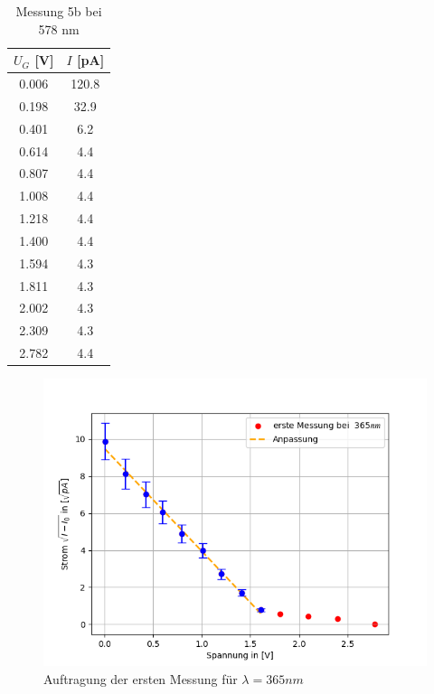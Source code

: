 \documentclass{article}
\begin{document}
\begin{table}[h!]
  \centering
  \begin{tabular}{|c|c|}
      \hline
      $U_G$ [V] & $I$ [pA] \\
      \hline
      0.006 & 120.8 \\
      0.198 & 32.9  \\
      0.401 & 6.2   \\
      0.614 & 4.4   \\
      0.807 & 4.4   \\
      1.008 & 4.4   \\
      1.218 & 4.4   \\
      1.400 & 4.4   \\
      1.594 & 4.3   \\
      1.811 & 4.3   \\
      2.002 & 4.3   \\
      2.309 & 4.3   \\
      2.782 & 4.4   \\
      \hline
  \end{tabular}
  \caption{Messung 5b bei 578 nm}
  \label{tab:messung5b}
\end{table}

\begin{figure}[h!]
  \centering
  \includegraphics[width=.8\linewidth]{402_365nm_a.png}
  \caption{Auftragung der ersten Messung für $ \lambda =365nm$}
  \label{fig:wellenlaenge_365nm_a}
\end{figure}
\end{document}
